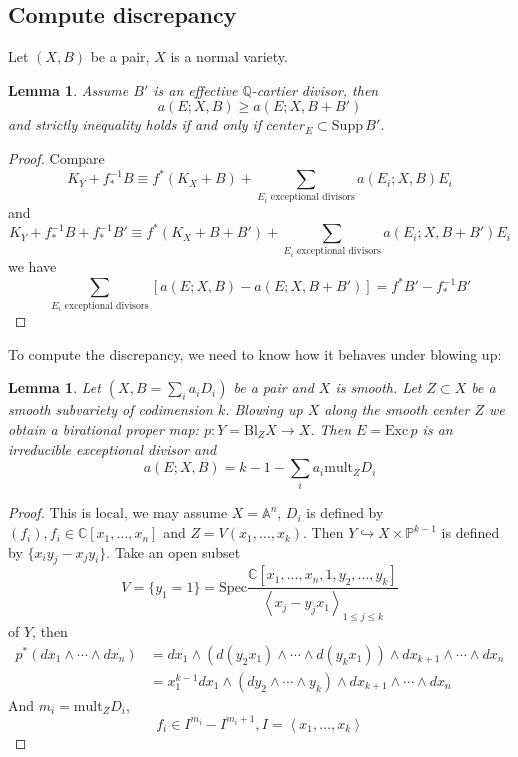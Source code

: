 \documentclass{article}
\newtheorem{lem}[defn]{Lemma}
\begin{document}
\subsection{Compute discrepancy}
Let $ (X,B) $ be a pair, $ X $ is a normal variety.
\begin{lem}
  Assume $ B' $ is an effective $ \mathbb{Q} $-cartier divisor, then \[ a(E;X,B)\geqslant a(E;X,B+B') \]
  and strictly inequality holds if and only if $ center_E\subset \mathrm{Supp}\, B' $.
\end{lem}
\begin{proof}
  Compare
  \[ K_Y+f^{-1}_*B\equiv f^*(K_X+B)+\sum_{E_i\text{ exceptional divisors}}a(E_i;X,B)E_i \]
  and
  \[ K_Y+f^{-1}_*B+f^{-1}_*B'\equiv f^*(K_X+B+B')+\sum_{E_i\text{ exceptional divisors}}a(E_i;X,B+B')E_i \]
  we have
  \[ \sum_{E_i\text{ exceptional divisors}}[a(E;X,B)- a(E;X,B+B')]=f^*B'-f^{-1}_*B' \]
\end{proof}
 To compute the discrepancy, we need to know how it behaves under blowing up:
 \begin{lem}
  Let $ (X,B=\sum_ia_iD_i) $ be a pair and $ X $ is smooth. Let $ Z\subset X $ be a smooth subvariety of codimension $ k $. Blowing up  $ X $ along the smooth center $ Z $ we obtain a birational proper map: $ p:Y=\mathrm{Bl}_ZX\to X $. Then $ E=\mathrm{Exc}\, p $ is an irreducible exceptional divisor and
  \[ a(E;X,B)=k-1-\sum_ia_i\mathrm{mult}_ZD_i \]
 \end{lem}
\begin{proof}
  This is local, we may assume $ X=\mathbb{A}^n $, $ D_i $ is defined by $ (f_i),f_i\in \mathbb{C}[x_1,\ldots,x_n] $ and $ Z=V(x_1,\ldots,x_{k}) $. Then $ Y\hookrightarrow X\times \mathbb{P}^{k-1} $ is defined by $ \{ x_iy_j-x_jy_i\} $. Take an open subset 
  \[ V=\{ y_1=1 \} =\mathrm{Spec}\frac{\mathbb{C}[x_1,\ldots,x_n,1,y_2,\ldots,y_k]}{\left <x_j-y_jx_1 \right >_{1\leqslant j\leqslant k}}\]
   of $ Y $, then 
   \begin{equation*}
    \begin{aligned}
     p^*(dx_1\wedge\cdots\wedge dx_n)&=dx_1\wedge (d(y_2x_1)\wedge\cdots\wedge d(y_kx_1))\wedge dx_{k+1}\wedge\cdots\wedge dx_n\\
     &=x_1^{k-1}dx_1\wedge (dy_2\wedge\cdots\wedge y_k)\wedge dx_{k+1}\wedge\cdots\wedge dx_n 
    \end{aligned}
   \end{equation*}
   And $ m_i=\mathrm{mult}_ZD_i $,
   \[
     f_i\in I^{m_i}-I^{m_i+1}, I=\left <x_1,\ldots,x_k\right >
   \]
\end{proof}
\end{document}
